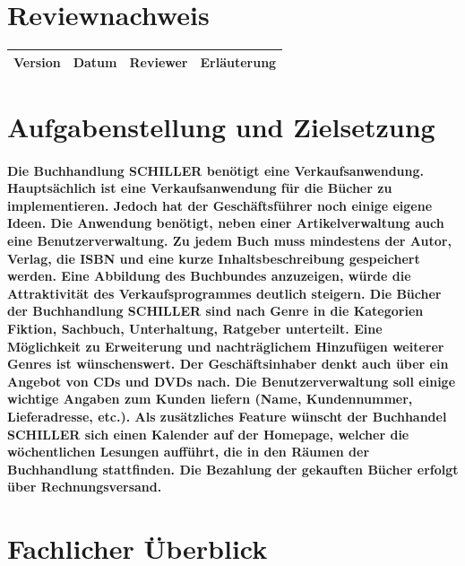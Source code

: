 \documentclass[a4paper]{article}
\begin{document}
\section*{Reviewnachweis}

\begin{tabular}{|l|l|l|l|}
	\hline
	\rowcolor[HTML]{C0C0C0} 
	Version & Datum      & Reviewer       & Erläuterung    \\ \hline
\end{tabular}

\newpage


\tableofcontents

\newpage
 
\section{Aufgabenstellung und Zielsetzung}

\paragraph{Die Buchhandlung SCHILLER benötigt eine Verkaufsanwendung. Hauptsächlich ist eine Verkaufsanwendung für die Bücher zu implementieren. Jedoch hat der Geschäftsführer noch einige eigene Ideen. 
Die Anwendung benötigt, neben einer Artikelverwaltung auch eine Benutzerverwaltung. Zu jedem Buch muss mindestens der Autor, Verlag, die ISBN und eine kurze Inhaltsbeschreibung gespeichert werden. Eine Abbildung des Buchbundes anzuzeigen, würde die Attraktivität des Verkaufsprogrammes deutlich steigern. Die Bücher der Buchhandlung SCHILLER sind nach Genre in die Kategorien Fiktion, Sachbuch, Unterhaltung, Ratgeber unterteilt. Eine Möglichkeit zu Erweiterung und nachträglichem Hinzufügen weiterer Genres ist wünschenswert. Der Geschäftsinhaber denkt auch über ein Angebot von CDs und DVDs nach. Die Benutzerverwaltung soll einige wichtige Angaben zum Kunden liefern (Name, Kundennummer, Lieferadresse, etc.). 
Als zusätzliches Feature wünscht der Buchhandel SCHILLER sich einen Kalender auf der Homepage, welcher die wöchentlichen Lesungen aufführt, die in den Räumen der Buchhandlung stattfinden. Die Bezahlung der gekauften Bücher erfolgt über Rechnungsversand.}

\section{Fachlicher Überblick}
\end{document}
